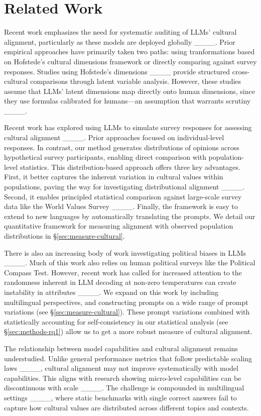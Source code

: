 \section{Related Work}
Recent work emphasizes the need for systematic auditing of LLMs' cultural alignment, particularly as these models are deployed globally ____. Prior empirical approaches have primarily taken two paths: using tranformations based on Hofstede's cultural dimensions framework or directly comparing against survey responses. Studies using Hofstede's dimensions ____ provide structured cross-cultural comparisons through latent variable analysis. However, these studies assume that LLMs' latent dimensions map directly onto human dimensions, since they use formulas calibrated for humans---an assumption that warrants scrutiny ____.

Recent work has explored using LLMs to simulate survey responses for assessing cultural alignment ____. Prior approaches focused on individual-level responses. In contrast, our method generates distributions of opinions across hypothetical survey participants, enabling direct comparison with population-level statistics. This distribution-based approach offers three key advantages. First, it better captures the inherent variation in cultural values within populations, paving the way for investigating distributional alignment ____. Second, it enables principled statistical comparison against large-scale survey data like the World Values Survey ____. Finally, the framework is easy to extend to new languages by automatically translating the prompts. We detail our quantitative framework for measuring alignment with observed population distributions in §\ref{sec:measure-cultural}.

There is also an increasing body of work investigating political biases in LLMs ____. Much of this work also relies on human political surveys like the Political Compass Test. However, recent work has called for increased attention to the randomness inherent in LLM decoding at non-zero temperatures can create instability in attributes ____. We expand on this work by including multilingual perspectives, and constructing prompts on a wide range of prompt variations (see §\ref{sec:measure-cultural}). These prompt variations combined with statistically accounting for self-consistency in our statistical analysis (see §\ref{sec:methods-rq1}) allow us to get a more robust measure of cultural alignment.

The relationship between model capabilities and cultural alignment remains understudied. Unlike general performance metrics that follow predictable scaling laws ____, cultural alignment may not improve systematically with model capabilities. This aligns with research showing micro-level capabilities can be discontinuous with scale ____. The challenge is compounded in multilingual settings ____, where static benchmarks with single correct answers fail to capture how cultural values are distributed across different topics and contexts.

